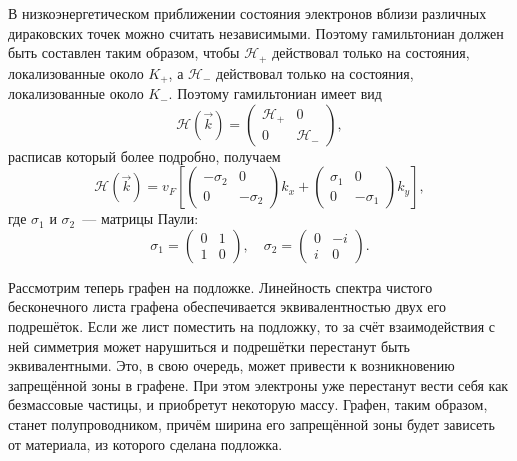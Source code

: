 В низкоэнергетическом приближении состояния электронов вблизи различных дираковских точек можно считать независимыми. Поэтому гамильтониан должен быть составлен таким образом, чтобы \( \mathcal{H}_+ \) действовал только на состояния, локализованные около \( K_+ \), а \( \mathcal{H}_- \) действовал только на состояния, локализованные около \( K_- \). Поэтому гамильтониан имеет вид
\begin{equation*}
      \mathcal{H}(\vec{k}) = 
      \begin{pmatrix}
        \mathcal{H}_+ & 0\\
        0 & \mathcal{H}_-
    \end{pmatrix},
\end{equation*}
расписав который более подробно, получаем
\begin{equation*}
      \mathcal{H}(\vec{k}) = 
      v_F
      \left[
      \begin{pmatrix}
        -\sigma_2 & 0\\
        0 & -\sigma_2
    \end{pmatrix} k_x +
      \begin{pmatrix}
        \sigma_1 & 0\\
        0 & -\sigma_1
    \end{pmatrix} k_y
    \right],
\end{equation*}
где \( \sigma_1 \) и \( \sigma_2 \)~--- матрицы Паули:
\[
  \sigma_1 = \begin{pmatrix}
    0 & 1 \\
    1 & 0
  \end{pmatrix}, \quad
  \sigma_2 = \begin{pmatrix}
    0 & -i \\
    i & 0
  \end{pmatrix}.
\]

Рассмотрим теперь графен на подложке. Линейность спектра чистого бесконечного листа графена обеспечивается эквивалентностью двух его подрешёток. Если же лист поместить на подложку, то за счёт взаимодействия с ней симметрия может нарушиться и подрешётки перестанут быть эквивалентными. Это, в свою очередь, может привести к возникновению запрещённой зоны в графене. При этом электроны уже перестанут вести себя как безмассовые частицы, и приобретут некоторую массу. Графен, таким образом, станет полупроводником, причём ширина его запрещённой зоны будет зависеть от материала, из которого сделана подложка.

